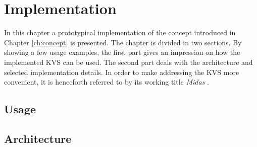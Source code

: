 \chapter{Implementation}
\label{ch:impl}

In this chapter a prototypical implementation of the concept introduced in
Chapter \ref{ch:concept} is presented. The chapter is divided in two sections.
By showing a few usage examples, the first part gives an impression on how the
implemented KVS can be used. The second part deals with the architecture and
selected implementation details. In order to make addressing the KVS more
convenient, it is henceforth referred to by its working title \emph{Midas}
\footnotemark.


\section{Usage}
\label{ch:impl-usage}


\clearpage

\section{Architecture}
\label{ch:impl-arch}


